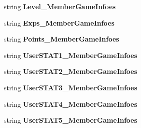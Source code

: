 \begin{DoxyCompactItemize}
\item 
string {\bfseries Level\+\_\+\+Member\+Game\+Infoes}\hypertarget{a00077_ab234e5c09a75d703aad90f303ad8e94d}{}\label{a00077_ab234e5c09a75d703aad90f303ad8e94d}

\item 
string {\bfseries Exps\+\_\+\+Member\+Game\+Infoes}\hypertarget{a00077_ad55d5bb4031141622b74da87fb27cd1d}{}\label{a00077_ad55d5bb4031141622b74da87fb27cd1d}

\item 
string {\bfseries Points\+\_\+\+Member\+Game\+Infoes}\hypertarget{a00077_aa9a3110ebdcf926fb483714429b3fbc8}{}\label{a00077_aa9a3110ebdcf926fb483714429b3fbc8}

\item 
string {\bfseries User\+S\+T\+A\+T1\+\_\+\+Member\+Game\+Infoes}\hypertarget{a00077_af8077f0d3f2b0db96d6edff725543db5}{}\label{a00077_af8077f0d3f2b0db96d6edff725543db5}

\item 
string {\bfseries User\+S\+T\+A\+T2\+\_\+\+Member\+Game\+Infoes}\hypertarget{a00077_a112be48ba7d742e07932504f2316a221}{}\label{a00077_a112be48ba7d742e07932504f2316a221}

\item 
string {\bfseries User\+S\+T\+A\+T3\+\_\+\+Member\+Game\+Infoes}\hypertarget{a00077_ae1b3346da76f748952c2c3a7a8123c32}{}\label{a00077_ae1b3346da76f748952c2c3a7a8123c32}

\item 
string {\bfseries User\+S\+T\+A\+T4\+\_\+\+Member\+Game\+Infoes}\hypertarget{a00077_aa76d503fae0261c7fa9ab8fd358f42c8}{}\label{a00077_aa76d503fae0261c7fa9ab8fd358f42c8}

\item 
string {\bfseries User\+S\+T\+A\+T5\+\_\+\+Member\+Game\+Infoes}\hypertarget{a00077_af7a3f8953161d54faf0cb9aac5712db0}{}\label{a00077_af7a3f8953161d54faf0cb9aac5712db0}


\end{DoxyCompactItemize}
